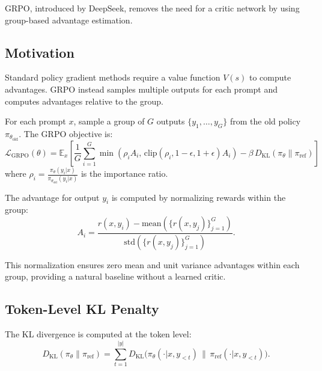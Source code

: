 GRPO, introduced by DeepSeek, removes the need for a critic network by using group-based advantage estimation.

\subsection{Motivation}

Standard policy gradient methods require a value function $V(s)$ to compute advantages. GRPO instead samples multiple outputs for each prompt and computes advantages relative to the group.

\begin{definition}
    For each prompt $x$, sample a group of $G$ outputs $\{y_1, \ldots, y_G\}$ from the old policy $\pi_{\theta_{\text{old}}}$. The GRPO objective is:
    \[
        \mathcal{L}_{\text{GRPO}}(\theta) = \mathbb{E}_{x} \left[ \frac{1}{G} \sum_{i=1}^{G} \min\left( \rho_i A_i, \, \text{clip}(\rho_i, 1-\epsilon, 1+\epsilon) A_i \right) - \beta \, D_{\mathrm{KL}}(\pi_\theta \| \pi_{\text{ref}}) \right]
    \]
    where $\rho_i = \frac{\pi_\theta(y_i|x)}{\pi_{\theta_{\text{old}}}(y_i|x)}$ is the importance ratio.
\end{definition}

\begin{definition}
    The advantage for output $y_i$ is computed by normalizing rewards within the group:
    \[
        A_i = \frac{r(x, y_i) - \text{mean}(\{r(x, y_j)\}_{j=1}^G)}{\text{std}(\{r(x, y_j)\}_{j=1}^G)}.
    \]
\end{definition}

\begin{remark}
    This normalization ensures zero mean and unit variance advantages within each group, providing a natural baseline without a learned critic.
\end{remark}

\subsection{Token-Level KL Penalty}

\begin{definition}
    The KL divergence is computed at the token level:
    \[
        D_{\mathrm{KL}}(\pi_\theta \| \pi_{\text{ref}}) = \sum_{t=1}^{|y|} D_{\mathrm{KL}}\bigl(\pi_\theta(\cdot | x, y_{<t}) \,\|\, \pi_{\text{ref}}(\cdot | x, y_{<t})\bigr).
    \]
\end{definition}

